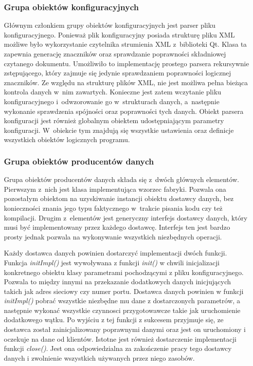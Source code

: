 \subsubsection[Grupa obiektów konfiguracyjnych][Grupa obiektów
konfiguracyjnych]{Grupa obiektów konfiguracyjnych}

Głównym członkiem grupy obiektów konfiguracyjnych jest parser pliku
konfiguracyjnego. Ponieważ plik konfiguracyjny posiada strukturę pliku
XML możliwe było wykorzystanie czytelnika strumienia XML z~biblioteki
Qt. Klasa ta zapewnia generację znaczników oraz sprawdzanie
poprawności składniowej czytanego dokumentu. Umożliwiło to
implementację prostego parsera rekursywnie zstępującego, który zajmuje
się jedynie sprawdzaniem poprawności logicznej znaczników. Ze względu
na strukturę plików XML, nie jest możliwa pełna bieżąca kontrola
danych w~nim zawartych. Konieczne jest zatem wczytanie pliku
konfiguracyjnego i~odwzorowanie go w~strukturach danych, a~następnie
wykonanie sprawdzenia spójności oraz poprawności tych danych. Obiekt
parsera konfiguracji jest również globalnym obiektem udostępniającym
parametry konfiguracji. W~obiekcie tym znajdują się wszystkie
ustawienia oraz definicje wszystkich obiektów logicznych programu.

\subsubsection[Grupa obiektów producentów danych][Grupa obiektów
producentów danych]{Grupa obiektów producentów danych}

Grupa obiektów producentów danych składa się z~dwóch głównych
elementów. Pierwszym z~nich jest klasa implementująca wzorzec
fabryki. Pozwala ona pozostałym obiektom na uzyskiwanie instancji
obiektu dostawcy danych, bez konieczności znania jego typu faktycznego
w~trakcie pisania kodu czy też kompilacji. Drugim z~elementów jest
generyczny interfejs dostawcy danych, który musi być implementowany
przez każdego dostawcę. Interfejs ten jest bardzo prosty jednak
pozwala na wykonywanie wszystkich niezbędnych operacji.

Każdy dostawca danych powinien dostarczyć implementacji dwóch
funkcji. Funkcja {\em initImpl()} jest wywoływana z funkcji {\em
  init()} w chwili inicjalizacji konkretnego obiektu klasy parametrami
pochodzącymi z pliku konfiguracyjnego. Pozwala to między innymi na
przekazanie dodatkowych danych inicjujących takich jak adres sieciowy
czy numer portu. Dostawca danych powinien w funkcji {\em initImpl()}
pobrać wszystkie niezbędne mu dane z dostarczonych parametrów, a
następnie wykonać wszystkie czynnosci przygotowawcze takie jak
uruchomienie dodatkowego wątku. Po wyjściu z tej funkcji z sukcesem
przyjmuje się, ze dostawca został zainicjalizowany poprawnymi danymi
oraz jest on uruchomiony i oczekuje na dane od klientów. Istotne jest
również dostarczenie implementacji funkcji {\em close()}. Jest ona
odpowiedzialna za zakończenie pracy tego dostawcy danych i zwolnienie
wszystkich używanych przez niego zasobów.

